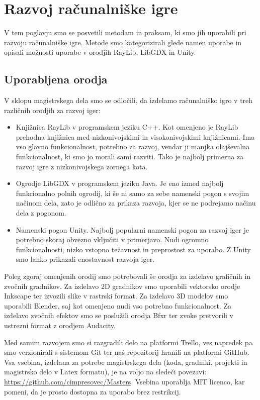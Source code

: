 \documentclass[12pt,a4paper,twoside]{book}
\begin{document}
\chapter{Razvoj računalniške igre}\thispagestyle{fancy}
\label{chapter:razvojIger}
V tem poglavju smo se posvetili metodam in praksam, ki smo jih uporabili pri razvoju računalniške igre. Metode smo kategorizirali glede namen uporabe in opisali možnosti uporabe v orodjih RayLib, LibGDX in Unity.
\section{Uporabljena orodja}
V sklopu magistrskega dela smo se odločili, da izdelamo računalniško igro v treh različnih orodjih za razvoj iger:
\begin{itemize}
	\item Knjižnica RayLib v programskem jeziku C++. Kot omenjeno je RayLib prehodna knjižnica med nizkonivojskimi in visokonivojskimi knjižnicami. Ima vso glavno funkcionalnost, potrebno za razvoj, vendar ji manjka olajševalna funkcionalnost, ki smo jo morali sami razviti. Tako je najbolj primerna za razvoj igre z nizkonivojskega zornega kota.
	\item Ogrodje LibGDX v programskem jeziku Java. Je eno izmed najbolj funkcionalno polnih ogrodij, ki še ni samo za sebe namenski pogon s svojim načinom dela, zato je odlično za prikaza razvoja, kjer se ne podrejamo načinu dela z pogonom.
	\item Namenski pogon Unity. Najbolj popularni namenski pogon za razvoj iger je potrebno skoraj obvezno vključiti v primerjavo. Nudi ogromno funkcionalnosti, nizko vstopno težavnost in preprostost za uporabo. Z Unity smo lahko prikazali enostavnost razvoja iger.
\end{itemize}

Poleg zgoraj omenjenih orodij smo potrebovali še orodja za izdelavo grafičnih in zvočnih gradnikov. Za izdelavo 2D gradnikov smo uporabili vektorsko orodje Inkscape ter izvozili slike v rastrski format. Za izdelavo 3D modelov smo uporabili Blender, saj kot omenjeno nudi vso potrebno funkcionalnost. Za izdelavo zvočnih efektov smo se poslužili orodja Bfxr ter zvoke pretvorili v ustrezni format z orodjem Audacity.

Med samim razvojem smo si razgradili delo na platformi Trello, ves napredek pa smo verzionirali s sistemom Git ter naš repozitorij hranili na platformi GitHub. Vsa vsebina, izdelana za potrebe magistrskega dela (koda, gradniki, projekti in magistrsko delo v Latex formatu), je na voljo na sledeči povezavi: \url{https://github.com/cimpresovec/Masters}. Vsebina uporablja MIT licenco, kar pomeni, da je prosto dostopna za uporabo brez restrikcij.
\end{document}
